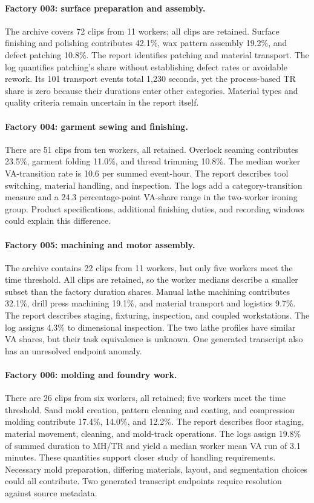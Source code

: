 \paragraph{Factory \textbf{003}: surface preparation and assembly.}
The archive covers 72 clips from 11 workers; all clips are retained. Surface finishing and polishing contributes 42.1\%, wax pattern assembly 19.2\%, and defect patching 10.8\%. The report identifies patching and material transport. The log quantifies patching's share without establishing defect rates or avoidable rework. Its 101 transport events total 1{,}230 seconds, yet the process-based TR share is zero because their durations enter other categories. Material types and quality criteria remain uncertain in the report itself.

\paragraph{Factory \textbf{004}: garment sewing and finishing.}
There are 51 clips from ten workers, all retained. Overlock seaming contributes 23.5\%, garment folding 11.0\%, and thread trimming 10.8\%. The median worker VA-transition rate is 10.6 per summed event-hour. The report describes tool switching, material handling, and inspection. The logs add a category-transition measure and a 24.3 percentage-point VA-share range in the two-worker ironing group. Product specifications, additional finishing duties, and recording windows could explain this difference.

\paragraph{Factory \textbf{005}: machining and motor assembly.}
The archive contains 22 clips from 11 workers, but only five workers meet the time threshold. All clips are retained, so the worker medians describe a smaller subset than the factory duration shares. Manual lathe machining contributes 32.1\%, drill press machining 19.1\%, and material transport and logistics 9.7\%. The report describes staging, fixturing, inspection, and coupled workstations. The log assigns 4.3\% to dimensional inspection. The two lathe profiles have similar VA shares, but their task equivalence is unknown. One generated transcript also has an unresolved endpoint anomaly.

\paragraph{Factory \textbf{006}: molding and foundry work.}
There are 26 clips from six workers, all retained; five workers meet the time threshold. Sand mold creation, pattern cleaning and coating, and compression molding contribute 17.4\%, 14.0\%, and 12.2\%. The report describes floor staging, material movement, cleaning, and mold-track operations. The logs assign 19.8\% of summed duration to MH/TR and yield a median worker mean VA run of 3.1 minutes. These quantities support closer study of handling requirements. Necessary mold preparation, differing materials, layout, and segmentation choices could all contribute. Two generated transcript endpoints require resolution against source metadata.

